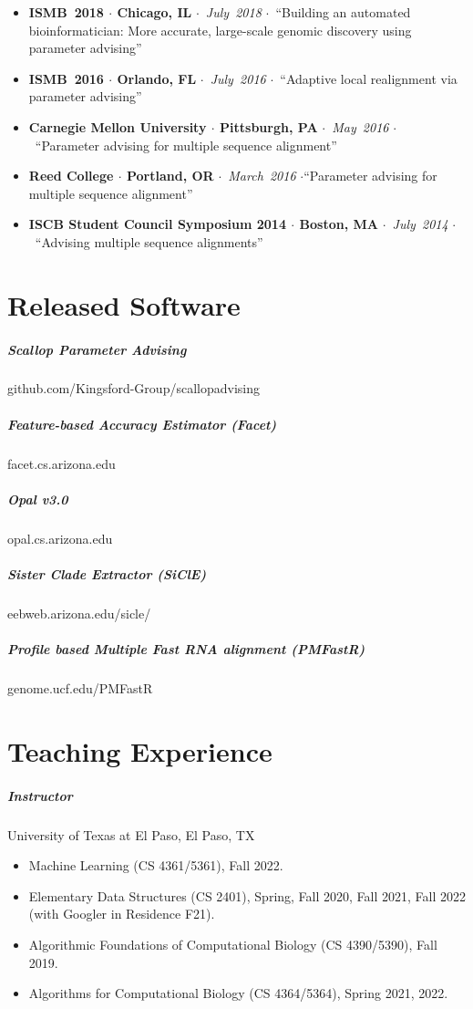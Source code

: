 \documentclass[10pt,letterpaper]{article}
\newcommand{\bigdot}{$\cdot$\xspace}
\begin{document}
\begin{itemize}[leftmargin=*,labelindent=5pt,itemindent=-15pt]
    \item \textbf{ISMB~2018 \bigdot Chicago, IL} \bigdot~\textit{July~2018} \bigdot~``Building an automated bioinformatician: More accurate, large-scale genomic discovery using parameter advising''
    \item \textbf{ISMB~2016 \bigdot Orlando, FL} \bigdot~\textit{July~2016} \bigdot~``Adaptive local realignment via parameter advising'' 
    \item \textbf{Carnegie Mellon University \bigdot Pittsburgh, PA} \bigdot~\textit{May~2016} \bigdot~``Parameter advising for multiple sequence alignment''
    \item \textbf{Reed College \bigdot Portland, OR} \bigdot~\textit{March~2016} \bigdot ``Parameter advising for multiple sequence alignment''
    \item \textbf{ISCB Student Council Symposium 2014 \bigdot  Boston, MA} \bigdot~\textit{July~2014} \bigdot~``Advising multiple sequence alignments''
   
\end{itemize}


\section*{Released Software}
\subparagraph{Scallop Parameter Advising}						github.com/Kingsford-Group/scallopadvising
\subparagraph{Feature-based Accuracy Estimator (Facet)} 			facet.cs.arizona.edu
\subparagraph{Opal v3.0}										opal.cs.arizona.edu 
\subparagraph{Sister Clade Extractor (SiClE)}						eebweb.arizona.edu/sicle/
\subparagraph{Profile based Multiple Fast RNA alignment (PMFastR)}	genome.ucf.edu/PMFastR 

\section*{Teaching Experience}

\subparagraph{Instructor}  University of Texas at El Paso, El Paso, TX
\begin{itemize}
	\item Machine Learning (CS 4361/5361), Fall 2022.
	\item Elementary Data Structures (CS 2401), Spring, Fall 2020, Fall 2021, Fall 2022 (with Googler in Residence F21).
	\item Algorithmic Foundations of Computational Biology (CS 4390/5390), Fall 2019.
	\item Algorithms for Computational Biology (CS 4364/5364), Spring 2021, 2022.
\end{itemize}
\end{document}
